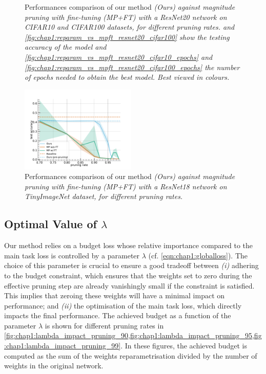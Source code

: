 \begin{figure}
  \caption{ Performances comparison of our method \em{(Ours)} against
    magnitude pruning with fine-tuning \em{(MP+FT)} with a ResNet20 network on
    CIFAR10 and CIFAR100 datasets, for different pruning rates.
     and
    \cref{fig:chap1:reparam_vs_mpft_resnet20_cifar100} show the
    testing accuracy of the model and
    \cref{fig:chap1:reparam_vs_mpft_resnet20_cifar10_epochs} and
    \cref{fig:chap1:reparam_vs_mpft_resnet20_cifar100_epochs}
    the number of epochs needed to obtain the best model. Best viewed in colours.}
  \label{fig:chap1:reparam_vs_mpft_resnet20}
\end{figure}


\begin{figure}
  \centering
  \includegraphics[width=0.49\textwidth]{chapter_1/assets/reparam_vs_mpft_PrunableResNet18_tinyimagenet.pdf}
  \caption{Performances comparison of our method \em{(Ours)} against
    magnitude pruning with fine-tuning \em{(MP+FT)} with a ResNet18 network on
    TinyImageNet dataset, for different pruning rates.}
  \label{fig:chap1:reparam_vs_mpft_resnet18}
\end{figure}



\subsection{Optimal Value of \texorpdfstring{$\lambda$}{Lambda}}
\label{sec:chap1:impact_of_lambda}


Our method relies on a budget loss whose relative importance compared to the
main task loss is controlled by a parameter $\lambda$ (cf.
\cref{eqn:chap1:globalloss}). The choice of this parameter is crucial to ensure
a good tradeoff between \emph{(i)} adhering to the budget constraint, which
ensures that the weights set to zero during the effective pruning step are
already vanishingly small if the constraint is satisfied. This implies that
zeroing these weights will have a minimal impact on performance; and \emph{(ii)}
the optimisation of the main task loss, which directly impacts the final
performance. The achieved budget as a function of the parameter $\lambda$ is
shown for different pruning rates in
\cref{fig:chap1:lambda_impact_pruning_90,fig:chap1:lambda_impact_pruning_95,fig:chap1:lambda_impact_pruning_99}.
In these figures, the achieved budget is computed as the sum of the weights
reparametrisation divided by the number of weights in the original network.\\

